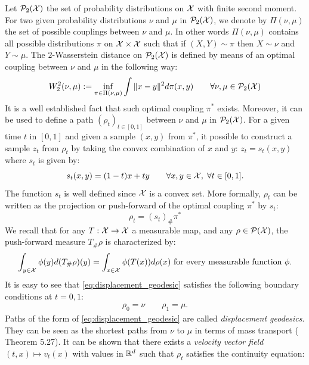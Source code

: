 Let $\mathcal{P}_2({{\mathcal X}})$ the set of probability distributions on ${{\mathcal X}}$ with finite second moment. For two given probability distributions $\nu$ and $\mu$ in $\mathcal{P}_2({{\mathcal X}})$, we denote by $\Pi(\nu,\mu)$ the set of possible couplings between $\nu$ and $\mu$. In other words $\Pi(\nu,\mu)$ contains all possible distributions $\pi$ on ${{\mathcal X}}\times {{\mathcal X}}$ such that if $(X,Y) \sim \pi $ then $X \sim \nu $ and $Y\sim \mu$. The $2$-Wasserstein distance on $\mathcal{P}_2({{\mathcal X}})$ is defined by means of an optimal coupling between $\nu$ and $\mu$ in the following way:
\begin{align}\label{eq:wasserstein_2}
W_2^2(\nu,\mu) := \inf_{\pi\in\Pi(\nu,\mu)} \int \Vert x - y\Vert^2 d\pi(x,y) \qquad \forall \nu, \mu\in \mathcal{P}_2({{\mathcal X}})
\end{align}
It is a well established fact that such optimal coupling $\pi^*$ exists. Moreover, it can be used to define a path $(\rho_t)_{t\in [0,1]}$ between $\nu$ and $\mu$ in $\mathcal{P}_2({{\mathcal X}})$. For a given time $t$ in $[0,1]$ and given a sample $(x,y)$ from $\pi^{*}$, it possible to construct a sample $z_t$ from $\rho_t$ by taking the convex combination of $x$ and $y$: $z_t = s_t(x,y)$ where $s_t$ is given by:
\begin{equation}\label{eq:convex_combination}
s_t(x,y) = (1-t)x+ty \qquad \forall x,y\in {{\mathcal X}}, \; \forall t\in [0,1].
\end{equation}
The function $s_t$ is well defined since ${{\mathcal X}}$ is a convex set. More formally, $\rho_t$ can be written as the projection or push-forward of the optimal coupling $\pi^{*}$ by $s_t$:  
\begin{equation}\label{eq:displacement_geodesic}
\rho_t = (s_t)_{\#}\pi^{*}
\end{equation}
We recall that for any $T: {{\mathcal X}} \rightarrow {{\mathcal X}}$ a measurable map, and any $\rho \in \mathcal{P}({{\mathcal X}})$, the push-forward measure $T_{\#}\rho$ is characterized by:
\begin{align}
\int_{y \in {{\mathcal X}}} \phi(y) d(T_{\#}\rho)(y) =\int_{x \in {{\mathcal X}}}\phi(T(x)) d\rho(x) \text{ for every measurable function $\phi$.}
\end{align}
It is easy to see that \cref{eq:displacement_geodesic} satisfies the following boundary conditions at $t=0,1$:
\begin{align}\label{eq:boundary_conditions}
\rho_0 = \nu \qquad \rho_1 = \mu.
\end{align}
Paths of the form of \cref{eq:displacement_geodesic} are called \textit{displacement geodesics}. They can be seen as the shortest paths from $\nu$ to $\mu$ in terms of mass transport (\cite{Santambrogio:2015} Theorem 5.27). It can be shown that there exists a \textit{velocity vector field} $(t,x)\mapsto v_t(x)$ with values in ${{\mathbb R}}^d$ such that $\rho_t$ satisfies the continuity equation:
